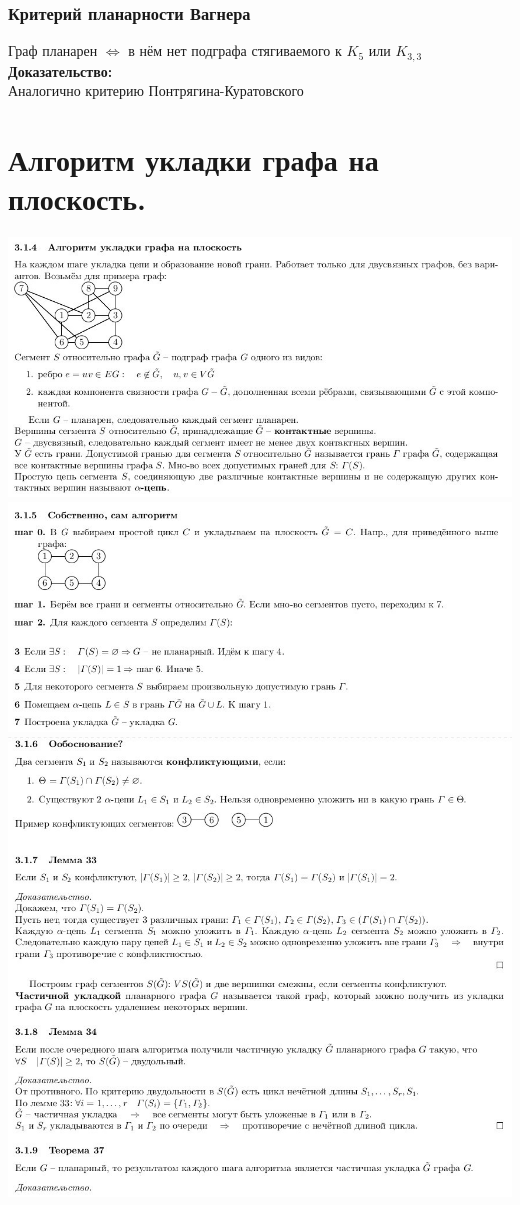 \documentclass[12pt]{article}
\begin{document}
\subsubsection{Критерий планарности Вагнера}
		Граф планарен $\Leftrightarrow$ в нём нет подграфа стягиваемого к $K_5$ или $K_{3,3}$\\
		\textbf{Доказательство:}\\
			Аналогично критерию Понтрягина-Куратовского\\
		\qedsymbol

\section{Алгоритм укладки графа на плоскость.}
		\includegraphics[width=550pt]{6}\\
		\includegraphics[width=550pt]{67}\\
		\includegraphics[width=550pt]{7}\\
\end{document}
